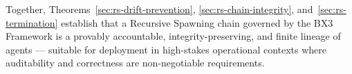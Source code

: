 Together, Theorems~\ref{sec:rs-drift-prevention}, \ref{sec:rs-chain-integrity}, and~\ref{sec:rs-termination} establish that a Recursive Spawning chain governed by the BX3 Framework is a provably accountable, integrity-preserving, and finite lineage of agents — suitable for deployment in high-stakes operational contexts where auditability and correctness are non-negotiable requirements.
